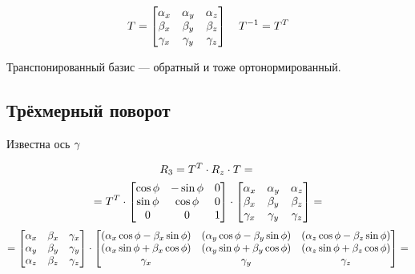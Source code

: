 \[
    T =
    \begin{bmatrix}
        \alpha_x & \alpha_y & \alpha_z \\
        \beta_x & \beta_y & \beta_z \\
        \gamma_x & \gamma_y & \gamma_z \\
    \end{bmatrix}
    \quad
    T^{-1} = T^T
\]

Транспонированный базис --- обратный и тоже ортонормированный.

\subsection{Трёхмерный поворот}
Известна ось $\gamma$

\[
    R_3 = T^T \cdot R_z \cdot T = \\
\]
\[
    = T^T \cdot
    \begin{bmatrix}
        \cos \phi & -\sin \phi & 0 \\
        \sin \phi &  \cos \phi & 0 \\
        0 & 0 & 1 \\
    \end{bmatrix} \cdot
    \begin{bmatrix}
        \alpha_x & \alpha_y & \alpha_z \\
        \beta_x & \beta_y & \beta_z \\
        \gamma_x & \gamma_y & \gamma_z \\
    \end{bmatrix} =
\]
\[
    =
    \begin{bmatrix}
        \alpha_x & \beta_x & \gamma_x \\
        \alpha_y & \beta_y & \gamma_y \\
        \alpha_z & \beta_z & \gamma_z \\
    \end{bmatrix}
    \cdot
    \begin{bmatrix}
        (\alpha_x \cos \phi - \beta_x \sin \phi) &
        (\alpha_y \cos \phi - \beta_y \sin \phi) &
        (\alpha_z \cos \phi - \beta_z \sin \phi) \\
        (\alpha_x \sin \phi + \beta_x \cos \phi) &
        (\alpha_y \sin \phi + \beta_y \cos \phi) &
        (\alpha_z \sin \phi + \beta_z \cos \phi) \\
        \gamma_x &
        \gamma_y &
        \gamma_z \\
    \end{bmatrix} =
\]
